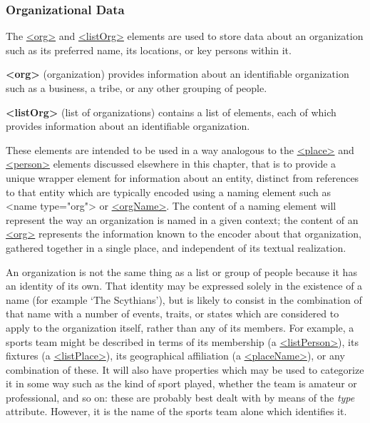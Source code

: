 \subsubsection[{Organizational Data}]{Organizational Data}\label{ND-org}\par
The \hyperref[TEI.org]{<org>} and \hyperref[TEI.listOrg]{<listOrg>} elements are used to store data about an organization such as its preferred name, its locations, or key persons within it. 
\begin{sansreflist}
  
\item [\textbf{<org>}] (organization) provides information about an identifiable organization such as a business, a tribe, or any other grouping of people.
\item [\textbf{<listOrg>}] (list of organizations) contains a list of elements, each of which provides information about an identifiable organization.
\end{sansreflist}
 These elements are intended to be used in a way analogous to the \hyperref[TEI.place]{<place>} and \hyperref[TEI.person]{<person>} elements discussed elsewhere in this chapter, that is to provide a unique wrapper element for information about an entity, distinct from references to that entity which are typically encoded using a naming element such as <name type="org"> or \hyperref[TEI.orgName]{<orgName>}. The content of a naming element will represent the way an organization is named in a given context; the content of an \hyperref[TEI.org]{<org>} represents the information known to the encoder about that organization, gathered together in a single place, and independent of its textual realization.\par
An organization is not the same thing as a list or group of people because it has an identity of its own. That identity may be expressed solely in the existence of a name (for example ‘The Scythians’), but is likely to consist in the combination of that name with a number of events, traits, or states which are considered to apply to the organization itself, rather than any of its members. For example, a sports team might be described in terms of its membership (a \hyperref[TEI.listPerson]{<listPerson>}), its fixtures (a \hyperref[TEI.listPlace]{<listPlace>}), its geographical affiliation (a \hyperref[TEI.placeName]{<placeName>}), or any combination of these. It will also have properties which may be used to categorize it in some way such as the kind of sport played, whether the team is amateur or professional, and so on: these are probably best dealt with by means of the {\itshape type} attribute. However, it is the name of the sports team alone which identifies it.\par
